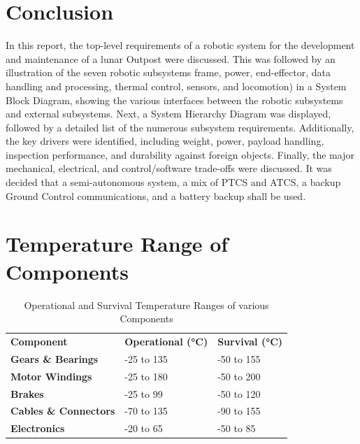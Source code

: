\documentclass[12pt, letterpaper]{article}
\begin{document}
\section{Conclusion}
\label{sect:conclusion}
In this report, the top-level requirements of a robotic system for the development and maintenance of a lunar Outpost were discussed. This was followed by an illustration of the seven robotic subsystems  frame, power, end-effector, data handling and processing, thermal control, sensors, and locomotion) in a System Block Diagram, showing the various interfaces between the robotic subsystems and external subsystems. Next, a System Hierarchy Diagram was displayed, followed by a detailed list of the numerous subsystem requirements. Additionally, the key drivers were identified, including weight, power, payload handling, inspection performance, and durability against foreign objects. Finally, the major mechanical, electrical, and control/software trade-offs were discussed. It was decided that a semi-autonomous system, a mix of PTCS and ATCS, a backup Ground Control communications, and a battery backup shall be used.
\newpage



\newpage
\appendix
\section{Temperature Range of Components}
\label{app:optemp}
\begin{table}[H]
\caption[Operational and Survival Temperature Ranges of various Components]{Operational and Survival Temperature Ranges of various Components \cite{NASAsysreq_Kumar}}
\centering
\begin{tabular}{|l|l|l|}
\hline
\textbf{Component}	&	\textbf{Operational (\si{\degreeCelsius})}	&	\textbf{Survival (\si{\degreeCelsius})}\\\hhline{|=|=|=|}
\textbf{Gears \& Bearings}		&	-25 to 135	&	-50 to 155	\\\hline
\textbf{Motor Windings}			&	-25 to 180	&	-50 to 200	\\\hline
\textbf{Brakes}					&	-25 to 99	&	-50 to 120	\\\hline
\textbf{Cables \& Connectors}	&	-70 to 135	&	-90 to 155	\\\hline
\textbf{Electronics}			&	-20 to 65	&	-50 to 85	\\\hline
\end{tabular}
\end{table}
\newpage
\end{document}
